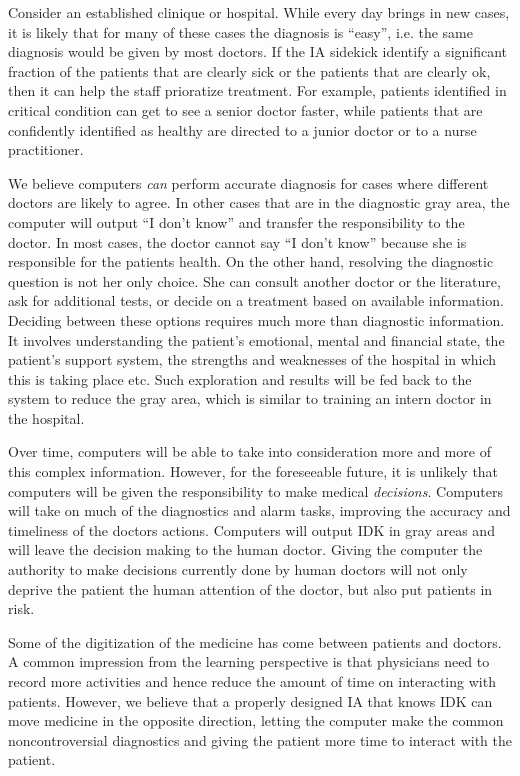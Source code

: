 \documentclass[11pt]{pnas-new}
\begin{document}
  Consider an established clinique or hospital. While every day brings
  in new cases, it is likely that for many of these cases the
  diagnosis is ``easy'', i.e. the same diagnosis would be given by
  most doctors. If the IA sidekick identify a significant fraction of
  the patients that are clearly sick or the patients that are clearly
  ok, then it can help the staff prioratize treatment. For example,
  patients identified in critical condition can get to see a senior
  doctor faster, while patients that are confidently identified as
  healthy are directed to a junior doctor or to a nurse practitioner.

  We believe computers {\em can} perform accurate diagnosis for cases where
  different doctors are likely to agree. In other cases {\color{blue}that are in the}
  diagnostic gray area, the computer will output ``I don't know'' and
  transfer the responsibility to the doctor. In most cases, the doctor
  cannot say ``I don't know'' because she is responsible for the
  patients health. On the other hand, resolving the diagnostic
  question is not her only choice. She can consult another doctor or
  the literature, ask for additional tests, or decide on a treatment
  based on available information. Deciding between these options requires much
  more than diagnostic information. It involves understanding the
  patient's emotional, mental and financial state, the patient's
  support system, the strengths and weaknesses of the hospital in
  which this is taking place etc. {\color{blue}Such exploration and results will be fed back to the system to reduce the gray area, which is similar to training an intern doctor in the hospital.}

  Over time, computers will be able to take into consideration more
  and more of this complex information. However, for the foreseeable
  future, it is unlikely that computers will be given the
  responsibility to make medical {\em decisions}. Computers
  will take on much of the diagnostics and alarm tasks, improving the
  accuracy and timeliness of the doctors actions. Computers will
  output IDK in gray areas and will leave the decision making to the
  human doctor. Giving the computer the authority to make decisions
  currently done by human doctors will {\color{blue}not only} deprive the patient the human
  attention of the doctor{\color{blue}, but also put patients in risk}.

  Some of the digitization of the medicine has come between patients
  and doctors. {\color{blue}A common impression from the learning perspective is that physicians need to record more activities and hence reduce the amount of time on interacting with patients. However, we} %
  believe that {\color{blue}a properly designed } IA {\color{blue}that knows IDK} can
  move medicine in the opposite direction, letting the computer make
  the common noncontroversial diagnostics and giving the patient more
  time to interact with the patient.
\end{document}
